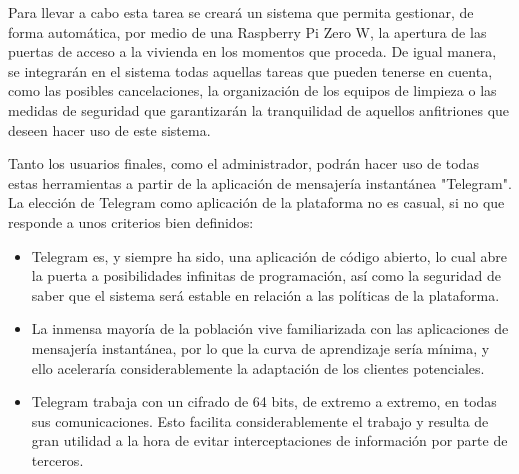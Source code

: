 \begin{resumen}
Para llevar a cabo esta tarea se creará un sistema que permita gestionar, de forma automática, por medio de una Raspberry Pi Zero W, la apertura de las puertas de acceso a la vivienda en los momentos que proceda. De igual manera, se integrarán en el sistema todas aquellas tareas que pueden tenerse en cuenta, como las posibles cancelaciones, la organización de los equipos de limpieza o las medidas de seguridad que garantizarán la tranquilidad de aquellos anfitriones que deseen hacer uso de este sistema.

Tanto los usuarios finales, como el administrador, podrán hacer uso de todas estas herramientas a partir de la aplicación de mensajería instantánea "Telegram". La elección de Telegram como aplicación de la plataforma no es casual, si no que responde a unos criterios bien definidos:
\begin{itemize}
\item Telegram es, y siempre ha sido, una aplicación de código abierto, lo cual abre la puerta a posibilidades infinitas de programación, así como la seguridad de saber que el sistema será estable en relación a las políticas de la plataforma. 
\item La inmensa mayoría de la población vive familiarizada con las aplicaciones de mensajería instantánea, por lo que la curva de aprendizaje sería mínima, y ello aceleraría considerablemente la adaptación de los clientes potenciales.
\item Telegram trabaja con un cifrado de 64 bits, de extremo a extremo, en todas sus comunicaciones. Esto facilita considerablemente el trabajo y resulta de gran utilidad a la hora de evitar interceptaciones de información por parte de terceros.
\end{itemize}
\end{resumen}

